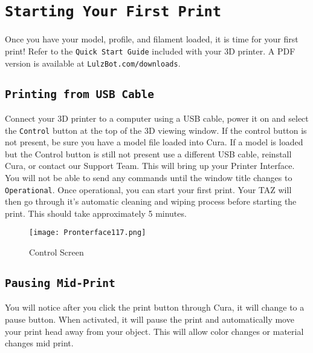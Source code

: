\section{\texttt{Starting Your First Print}}
Once you have your model, profile, and filament loaded, it is time for your first print! Refer to the \texttt{Quick Start Guide} included with your 3D printer. A PDF version is available at \texttt{LulzBot.com/downloads}.

\subsection{\texttt{Printing from USB Cable}}

Connect your 3D printer to a computer using a USB cable, power it on and select the \texttt{Control} button at the top of the 3D viewing window. If the control button is not present, be sure you have a model file loaded into Cura. If a model is loaded but the Control button is still not present use a different USB cable, reinstall Cura, or contact our Support Team. This will bring up your Printer Interface. You will not be able to send any commands until the window title changes to \texttt{Operational}. Once operational, you can start your first print. Your TAZ will then go through it's automatic cleaning and wiping process before starting the print. This should take approximately 5 minutes.

\begin{figure}[H]
\centering
\texttt{[image: Pronterface117.png]}
\caption{Control Screen}
\label{fig:Control}
\end{figure}

\subsection{\texttt{Pausing Mid-Print}}
You will notice after you click the print button through Cura, it will change to a pause button. When activated, it will pause the print and automatically move your print head away from your object. This will allow color changes or material changes mid print.

